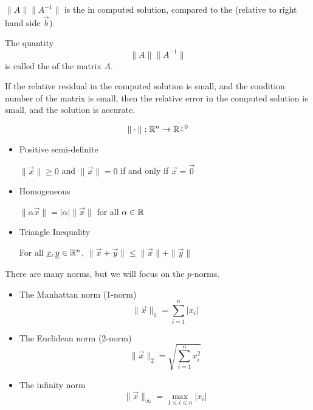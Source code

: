 \( \| A \| \| A^{-1} \| \) is the  in computed solution, compared to the  (relative to right hand side \( \vec{b} \)).

The quantity \[
    \| A \| \| A^{-1} \|
\] is called the  of the matrix \( A \).

\begin{remark}
    If the relative residual in the computed solution is small, and the condition number of the matrix is small, then the relative error in the computed solution is small, and the solution is accurate.
\end{remark}

\begin{remark}
    \[
        \| \cdot \|: \mathbb{R}^n \to \mathbb{R}^{_\geq 0}
    \]

    \begin{itemize}
        \item Positive semi-definite

              \( \| \vec{x} \| \geq 0 \) and \( \| \vec{x} \| = 0 \) if and only if \( \vec{x} = \vec{0} \)

        \item Homogeneous

              \( \| \alpha \vec{x} \| = | \alpha | \| \vec{x} \| \) for all \( \alpha \in \mathbb{R} \)

        \item Triangle Inequality

              For all \( \underline{x}, \underline{y} \in \mathbb{R}^n \), \( \| \vec{x} + \vec{y} \| \leq \| \vec{x} \| + \| \vec{y} \| \)
    \end{itemize}

    There are many norms, but we will focus on the \( p \)-norms.
    \begin{itemize}
        \item The Manhattan norm (1-norm) \[
                  \| \vec{x} \|_1 = \sum_{i=1}^n | x_i |
              \]

        \item The Euclidean norm (2-norm) \[
                  \| \vec{x} \|_2 = \sqrt{\sum_{i=1}^n x_i^2}
              \]

        \item The infinity norm \[
                  \| \vec{x} \|_\infty = \max_{1 \leq i \leq n} | x_i |
              \]
    \end{itemize}
\end{remark}

